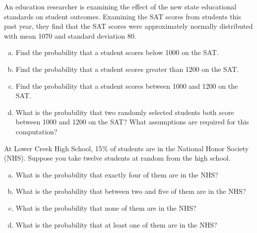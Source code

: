 \documentclass[11pt,letterpaper]{article}
\begin{document}

 An education researcher is examining the effect of the new state educational standards on student outcomes. Examining the SAT scores from students this past year, they find that the SAT scores were approximately normally distributed with mean 1070 and standard deviation 80.
	\begin{enumerate}[(a)]
	\item Find the probability that a student scores below 1000 on the SAT.
	\item Find the probability that a student scores greater than 1200 on the SAT.
	\item Find the probability that a student scores between 1000 and 1200 on the SAT.
	\item What is the probability that two randomly selected students both score between 1000 and 1200 on the SAT? What assumptions are required for this computation? 
	\end{enumerate}



\newpage



 At Lower Creek High School, 15\% of students are in the National Honor Society (NHS). Suppose you take twelve students at random from the high school.
	\begin{enumerate}[(a)]
	\item What is the probability that exactly four of them are in the NHS?
	\item What is the probability that between two and five of them are in the NHS?
	\item What is the probability that none of them are in the NHS?
	\item What is the probability that at least one of them are in the NHS?
	\end{enumerate}
\end{document}
